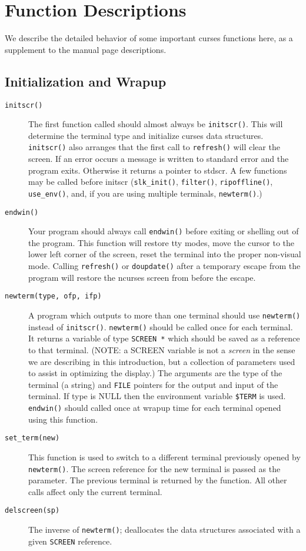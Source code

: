 \section{Function Descriptions}

\label{f0:functions}We describe the detailed behavior of some important curses functions here, as a
supplement to the manual page descriptions.

\subsection{Initialization and Wrapup}

\label{f0:init}\begin{description}\item[ \texttt{initscr()}]  The first function called should almost always be \texttt{initscr()}.
This will determine the terminal type and
initialize curses data structures. \texttt{initscr()} also arranges that
the first call to \texttt{refresh()} will clear the screen.  If an error
occurs a message is written to standard error and the program
exits. Otherwise it returns a pointer to stdscr.  A few functions may be
called before initscr (\texttt{slk\_init()}, \texttt{filter()},
\texttt{ripoffline()}, \texttt{use\_env()}, and, if you are using multiple
terminals, \texttt{newterm()}.)
\item[ \texttt{endwin()}]  Your program should always call \texttt{endwin()} before exiting or
shelling out of the program. This function will restore tty modes,
move the cursor to the lower left corner of the screen, reset the
terminal into the proper non-visual mode.  Calling \texttt{refresh()}
or \texttt{doupdate()} after a temporary escape from the program will
restore the ncurses screen from before the escape.
\item[ \texttt{newterm(type, ofp, ifp)}]  A program which outputs to more than one terminal should use
\texttt{newterm()} instead of \texttt{initscr()}.  \texttt{newterm()} should
be called once for each terminal.  It returns a variable of type
\texttt{SCREEN *} which should be saved as a reference to that
terminal.
(NOTE: a SCREEN variable is not a \emph{screen} in the sense we
are describing in this introduction, but a collection of 
parameters used to assist in optimizing the display.)
The arguments are the type of the terminal (a string) and
\texttt{FILE} pointers for the output and input of the terminal.  If
type is NULL then the environment variable \texttt{\$TERM} is used.
\texttt{endwin()} should called once at wrapup time for each terminal
opened using this function.
\item[ \texttt{set\_term(new)}]  This function is used to switch to a different terminal previously
opened by \texttt{newterm()}.  The screen reference for the new terminal
is passed as the parameter.  The previous terminal is returned by the
function.  All other calls affect only the current terminal.
\item[ \texttt{delscreen(sp)}]  The inverse of \texttt{newterm()}; deallocates the data structures
associated with a given \texttt{SCREEN} reference.
\end{description}


